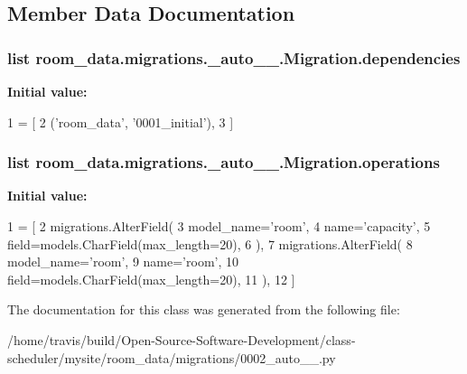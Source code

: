 \subsection{Member Data Documentation}
\hypertarget{classroom__data_1_1migrations_1_10002__auto__20180226__1350_1_1_migration_a31f1e9c6fcfef093a656c2c09c0958a1}{
\subsubsection[{dependencies}]{\setlength{\rightskip}{0pt plus 5cm}list room\-\_\-data.\-migrations.\-\_\-auto\-\_\-\_.\-Migration.\-dependencies\hspace{0.3cm}{\ttfamily [static]}}}\label{classroom__data_1_1migrations_1_10002__auto__20180226__1350_1_1_migration_a31f1e9c6fcfef093a656c2c09c0958a1}
{\bfseries Initial value\-:}
\begin{DoxyCode}
1 = [
2         (\textcolor{stringliteral}{'room\_data'}, \textcolor{stringliteral}{'0001\_initial'}),
3     ]
\end{DoxyCode}
\hypertarget{classroom__data_1_1migrations_1_10002__auto__20180226__1350_1_1_migration_affcbd4026c018e7d60fc5db2f6b460e3}{
\subsubsection[{operations}]{\setlength{\rightskip}{0pt plus 5cm}list room\-\_\-data.\-migrations.\-\_\-auto\-\_\-\_.\-Migration.\-operations\hspace{0.3cm}{\ttfamily [static]}}}\label{classroom__data_1_1migrations_1_10002__auto__20180226__1350_1_1_migration_affcbd4026c018e7d60fc5db2f6b460e3}
{\bfseries Initial value\-:}
\begin{DoxyCode}
1 = [
2         migrations.AlterField(
3             model\_name=\textcolor{stringliteral}{'room'},
4             name=\textcolor{stringliteral}{'capacity'},
5             field=models.CharField(max\_length=20),
6         ),
7         migrations.AlterField(
8             model\_name=\textcolor{stringliteral}{'room'},
9             name=\textcolor{stringliteral}{'room'},
10             field=models.CharField(max\_length=20),
11         ),
12     ]
\end{DoxyCode}


The documentation for this class was generated from the following file\-:\begin{DoxyCompactItemize}
\item 
/home/travis/build/\-Open-\/\-Source-\/\-Software-\/\-Development/class-\/scheduler/mysite/room\-\_\-data/migrations/0002\-\_\-auto\-\_\-\_.\-py\end{DoxyCompactItemize}

